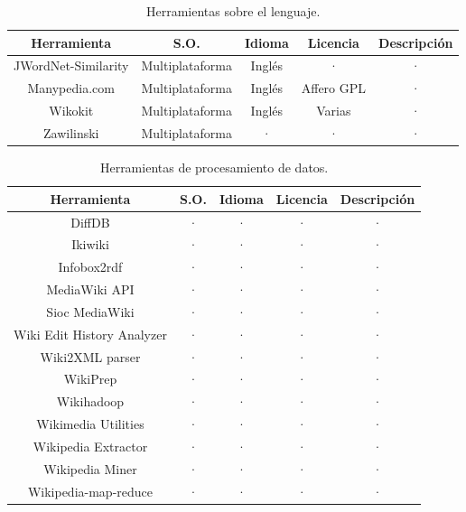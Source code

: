 \documentclass[11pt,onecolumn]{article}
\begin{document}
\begin{table}
\centering
\begin{tabular}{| c | c | c | c | c |}
\hline
\textbf{Herramienta} & \textbf{S.O.} & \textbf{Idioma} & \textbf{Licencia} & \textbf{Descripción} \\
\hline
JWordNet-Similarity & Multiplataforma & Inglés & · & · \\ \hline 
Manypedia.com & Multiplataforma & Inglés & Affero GPL & · \\ \hline 
Wikokit & Multiplataforma & Inglés & Varias & · \\ \hline 
Zawilinski & Multiplataforma & · & · & · \\ \hline 
\end{tabular}
\caption{Herramientas sobre el lenguaje.}
\label{tab:languagetoolstable}
\end{table}


\begin{table}
\centering
\begin{tabular}{| c | c | c | c | c |}
\hline
\textbf{Herramienta} & \textbf{S.O.} & \textbf{Idioma} & \textbf{Licencia} & \textbf{Descripción} \\
\hline
DiffDB & · & · & · & · \\ \hline 
Ikiwiki & · & · & · & · \\ \hline 
Infobox2rdf & · & · & · & · \\ \hline 
MediaWiki API & · & · & · & · \\ \hline 
Sioc MediaWiki & · & · & · & · \\ \hline 
Wiki Edit History Analyzer & · & · & · & · \\ \hline 
Wiki2XML parser & · & · & · & · \\ \hline 
WikiPrep & · & · & · & · \\ \hline 
Wikihadoop & · & · & · & · \\ \hline 
Wikimedia Utilities & · & · & · & · \\ \hline 
Wikipedia Extractor & · & · & · & · \\ \hline 
Wikipedia Miner & · & · & · & · \\ \hline 
Wikipedia-map-reduce & · & · & · & · \\ \hline 
\end{tabular}
\caption{Herramientas de procesamiento de datos.}
\label{tab:dataprocessingtoolstable}
\end{table}
\end{document}
